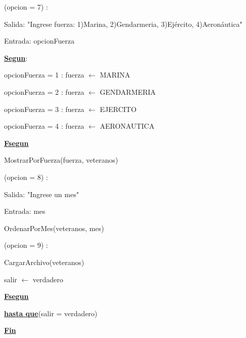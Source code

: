 \documentclass{article}
\begin{document}
        \hspace{12mm}(opcion = 7) : 
        
            \hspace{16mm}Salida: "Ingrese fuerza: 1)Marina, 2)Gendarmeria, 3)Ejército, 4)Aeronáutica"

            \hspace{16mm}Entrada: opcionFuerza

            \hspace{16mm}\underline{\textbf{Segun}}:

                \hspace{20mm}opcionFuerza = 1 : fuerza $\leftarrow$ MARINA

                \hspace{20mm}opcionFuerza = 2 : fuerza $\leftarrow$ GENDARMERIA

                \hspace{20mm}opcionFuerza = 3 : fuerza $\leftarrow$ EJERCITO

                \hspace{20mm}opcionFuerza = 4 : fuerza $\leftarrow$ AERONAUTICA

            \hspace{16mm}\underline{\textbf{Fsegun}}

            \hspace{16mm}MostrarPorFuerza(fuerza, veteranos)

        \hspace{12mm}(opcion = 8) :

            \hspace{16mm}Salida: "Ingrese un mes"

            \hspace{16mm}Entrada: mes

            \hspace{16mm}OrdenarPorMes(veteranos, mes)

        \hspace{12mm}(opcion = 9) :
            
            \hspace{16mm}CargarArchivo(veteranos)

            \hspace{16mm}salir $\leftarrow$ verdadero

    \hspace{8mm}\underline{\textbf{Fsegun}}

    \hspace{4mm}\underline{\textbf{hasta que}}(salir = verdadero)

    \underline{\textbf{Fin}}
\end{document}
